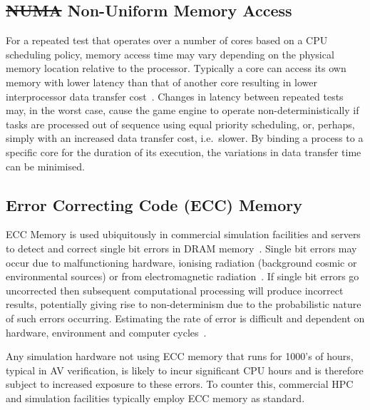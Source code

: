 \documentclass[letterpaper, 10 pt, journal, twoside]{IEEEtran}
\providecommand{\DIFaddtex}[1]{{\protect\color{blue}\uwave{#1}}} %
\providecommand{\DIFdeltex}[1]{{\protect\color{red}\sout{#1}}}                      %
\providecommand{\DIFaddbegin}{} %
\providecommand{\DIFaddend}{} %
\providecommand{\DIFdelbegin}{} %
\providecommand{\DIFdelend}{} %
\providecommand{\DIFadd}[1]{\texorpdfstring{\DIFaddtex{#1}}{#1}} %
\providecommand{\DIFdel}[1]{\texorpdfstring{\DIFdeltex{#1}}{}} %
\begin{document}
\subsection{\DIFdelbegin \DIFdel{NUMA }\DIFdelend Non-Uniform Memory Access \DIFaddbegin \DIFadd{(NUMA)}\DIFaddend }
For a repeated test that operates over a number of cores based on a CPU scheduling policy, memory access time may vary depending on the physical memory location relative to the processor. Typically a core can access its own memory with lower latency than that of another core resulting in lower interprocessor data transfer cost~\cite{nieplocha1996global}. 
%
Changes in latency between repeated tests may, in the worst case, cause the game engine to operate non-deterministically if tasks are processed out of sequence using equal priority scheduling, or, perhaps, simply with an increased data transfer cost, i.e.\ slower. 
%
By binding a process to a specific core for the duration of its execution, the variations in data transfer time can be minimised.


\subsection{Error Correcting Code (ECC) Memory}
ECC Memory is used ubiquitously in commercial simulation facilities and servers to detect and correct single bit errors in DRAM memory~\cite{Dell1997}. Single bit errors may occur due to malfunctioning hardware, ionising radiation (background cosmic or environmental sources) or from electromagnetic radiation~\cite{dodd2003basic}. If single bit errors go uncorrected then subsequent computational processing will produce incorrect results, potentially giving rise to non-determinism due to the probabilistic nature of such errors occurring. Estimating the rate of error is difficult and dependent on hardware, environment and computer cycles~\cite{mielke2008bit}.

Any simulation hardware not using ECC memory that runs for 1000's of hours, typical in AV verification, is likely to incur significant CPU hours and is therefore subject to increased exposure to these errors. To counter this, commercial HPC and simulation facilities typically employ ECC memory as standard.

\end{document}

